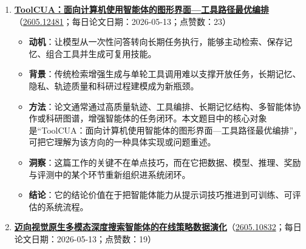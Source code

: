 \begin{enumerate}[leftmargin=1.5em]
  \begin{itemize}[leftmargin=1.5em]
    \item \textbf{动机}：让模型从一次性问答转向长期任务执行，能够主动检索、保存记忆、组合工具并生成可复用技能。
    \item \textbf{背景}：传统检索增强生成与单轮工具调用难以支撑开放任务，长期记忆、隐私、轨迹质量和科研过程建模成为新瓶颈。
    \item \textbf{方法}：论文通常通过高质量轨迹、工具编排、长期记忆结构、多智能体协作或科研图谱，增强智能体的任务闭环。本文题目中的核心对象是“RubricEM：超越可验证奖励的评价细则引导策略分解元强化学习”，可把它理解为该方向的一种具体实现或问题重述。
    \item \textbf{洞察}：奖励信号越能贴近任务结构，后训练越可能稳定地产生能力增益。
    \item \textbf{结论}：它的结论价值在于把智能体能力从提示词技巧推进到可训练、可评估的系统流程。
  \end{itemize}
  \item \textbf{\href{https://huggingface.co/papers/2605.12481}{ToolCUA：面向计算机使用智能体的图形界面—工具路径最优编排}}（\href{https://arxiv.org/abs/2605.12481}{2605.12481}；每日论文日期：2026-05-13；点赞数：23）
  \begin{itemize}[leftmargin=1.5em]
    \item \textbf{动机}：让模型从一次性问答转向长期任务执行，能够主动检索、保存记忆、组合工具并生成可复用技能。
    \item \textbf{背景}：传统检索增强生成与单轮工具调用难以支撑开放任务，长期记忆、隐私、轨迹质量和科研过程建模成为新瓶颈。
    \item \textbf{方法}：论文通常通过高质量轨迹、工具编排、长期记忆结构、多智能体协作或科研图谱，增强智能体的任务闭环。本文题目中的核心对象是“ToolCUA：面向计算机使用智能体的图形界面—工具路径最优编排”，可把它理解为该方向的一种具体实现或问题重述。
    \item \textbf{洞察}：这篇工作的关键不在单点技巧，而在它把数据、模型、推理、奖励与评测中的某个环节重新组织进系统闭环。
    \item \textbf{结论}：它的结论价值在于把智能体能力从提示词技巧推进到可训练、可评估的系统流程。
  \end{itemize}
  \item \textbf{\href{https://huggingface.co/papers/2605.10832}{迈向视觉原生多模态深度搜索智能体的在线策略数据演化}}（\href{https://arxiv.org/abs/2605.10832}{2605.10832}；每日论文日期：2026-05-13；点赞数：19）
  \begin{itemize}[leftmargin=1.5em]

\end{itemize}
\end{enumerate}

